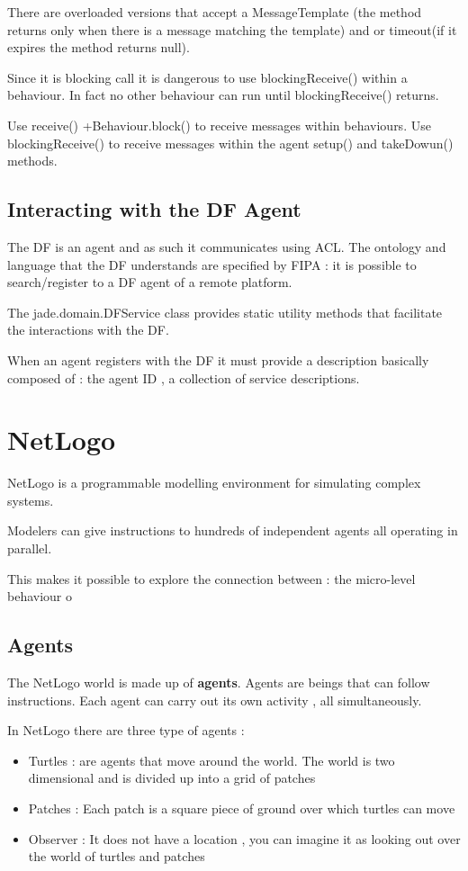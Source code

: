 \documentclass{article}
\begin{document}
There are overloaded versions that accept a MessageTemplate (the method returns only when there is a message matching the template) and or timeout(if it expires the method returns null).

Since it is blocking call it is dangerous to use blockingReceive() within a behaviour. In fact no other behaviour can run until blockingReceive() returns.

Use receive() +Behaviour.block() to receive messages within behaviours. Use blockingReceive() to receive messages within the agent setup() and takeDowun() methods.

\subsection{Interacting with the DF Agent}

The DF is an agent and as such it communicates using ACL. The ontology and language that the DF understands are specified by FIPA : it is possible to search/register to a DF agent of a remote platform.

The jade.domain.DFService class provides static utility methods that facilitate the interactions with the DF.

When an agent registers with the DF it must provide a description basically composed of : the agent ID , a collection of service descriptions.

\section{NetLogo}

NetLogo is a programmable modelling environment for simulating complex systems.

Modelers can give instructions to hundreds of independent agents all operating in parallel.

This makes it possible to explore the connection between : the micro-level behaviour o

\subsection{Agents}

The NetLogo world is made up of \textbf{agents}. Agents are beings that can follow instructions. Each agent can carry out its own activity , all simultaneously.

In NetLogo there are three type of agents : 

\begin{itemize}
    \item Turtles : are agents that move around the world. The world is two dimensional and is divided up into a grid of patches
    \item Patches : Each patch is a square piece of ground over which turtles can move
    \item Observer : It does not have a location , you can imagine it as looking out over the world of turtles and patches
\end{itemize}
\end{document}
